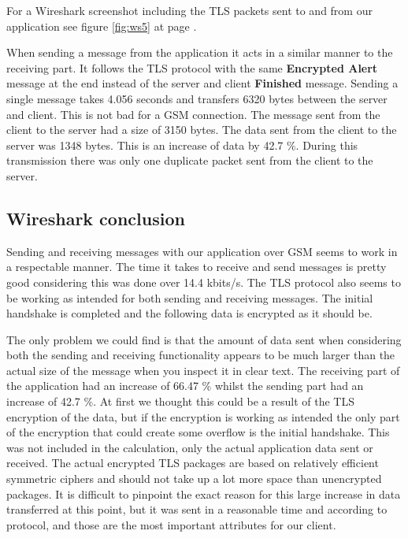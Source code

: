 For a Wireshark screenshot including the TLS packets sent to and from our application see figure \ref{fig:ws5} at page \pageref{fig:ws5}.
\newline

When sending a message from the application it acts in a similar manner to the receiving part. It follows the TLS protocol with the same \textbf{Encrypted Alert} message at the end instead of the server and client \textbf{Finished} message. 
\newline
\newline
Sending a single message takes 4.056 seconds and transfers 6320 bytes between the server and client. This is not bad for a GSM connection. The message sent from the client to the server had a size of 3150 bytes. The data sent from the client to the server was 1348 bytes.
This is an increase of data by 42.7 \%. During this transmission there was only one duplicate packet sent from the client to the server.

\newpage

\subsection{Wireshark conclusion}
Sending and receiving messages with our application over GSM seems to work in a respectable manner. The time it takes to receive and send messages is pretty good considering this was done over 14.4 kbits/s. The TLS protocol also seems to be working as intended for both sending and receiving messages. The initial handshake is completed and the following data is encrypted as it should be. 
\newline

The only problem we could find is that the amount of data sent when considering both the sending and receiving functionality appears to be much larger than the actual size of the message when you inspect it in clear text. The receiving part of the application had an increase of 66.47 \% whilst the sending part had an increase of 42.7 \%. 
\newline
\newline
At first we thought this could be a result of the TLS encryption of the data, but if the encryption is working as intended the only part of the encryption that could create some overflow is the initial handshake. This was not included in the calculation, only the actual application data sent or received. The actual encrypted TLS packages are based on relatively efficient symmetric ciphers and should not take up a lot more space than unencrypted packages.  
\newline
\newline
It is difficult to pinpoint the exact reason for this large increase in data transferred at this point, but it was sent in a reasonable time and according to protocol, and those are the most important attributes for our client.  
